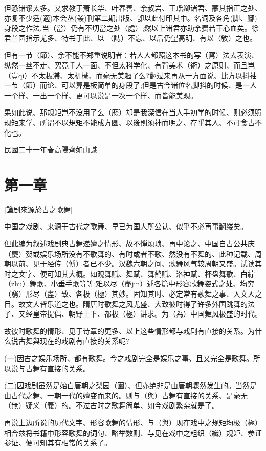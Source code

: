 \documentclass{zhvt-classic}
\begin{document}
但恐错谬太多。又求教于萧长华、叶春善、余叔岩、王瑶卿诸君、蒙其指正之处、亦复不少适(適)本会丛(叢)刊第二期出版、卽以此付印其中。名词及各角(脚、腳)身段之作法,当（當）仍有不切當之处（處）;然以上诸君亦助余费若干心血矣。徐君兰园指示尤多、特书于此、以𰵧（誌）不忘、以后仍望高明、有以（敎）之也。

但有一节（節）、余不能不郑重说明者：若人人都照这本书的写（寫）法去表演、纵然一丝不走、究竟千人一面、不但太科学化、有背美术（術）之原则、而且岂（豈qi）不太板滞、太机械、而毫无美趣了么?翻过来再从一方面说、比方以抖袖一节（節）而论、可以算是板简单的身段了;但是古今诸位名脚抖的时候、是一人一个样、一出一个样、更可以说是一次一个样、而皆能美观。

果如此说、那规矩岂不没用了么（厯）却是我深信在当人手初学的时候、则必须照规矩来学、所谓不以規矩不能成方圆、以後則须神而明之、存乎其人、不可食古不化也。

民國二十一年春高陽齊如山識

\chapter*[]{第一章}[論剧來源於古之歌舞]
\begin{preface}
中国之戏剧、来源于古代之歌舞、早已为国人所公认、似乎不必再事翻缕矣。
\end{preface}

但此编为叙述戏剧典古舞递嬗之情形、故不惮烦琐、再中论之、中国自古公共庆（慶）贺或娱乐场所没有不歌舞的、有时或者不歌、然没有不舞的、此种记载、周朝以前、见于经传（傅）者已不少。汉魏六朝之间、歌舞风气较周朝又盛。试读其时之文字、便可知其大概。如观舞赋、舞赋、舞鹤赋、洛神赋、杯盘舞歌、白紵（zhu）舞歌、小垂手歌等等;难以尽（盡jin）述各篇中形容歌舞姿式之处、均穷（窮）形尽（盡）致、各极（極）其妙。固知其时、必定常有歌舞之事、入文人之目。故文人皆乐道之也。隋唐时歌舞之风尤盛、大致彼时得了许多外国跳舞的法子、又经皇帝提倡、朝野上下、都极（極）讲求。为（為）中国舞风极盛的时代。

故彼时歌舞的情形、见于诗章的更多、以上这些情形都与戏剧有直接的关系。为什么说古舞與现在的戏剧有直接的关系呢?

(一)因古之娱乐场所、都有歌舞。今之戏剧完全是娱乐之事、且又完全是歌舞。所以说与古舞有直接的关系。

(二)因戏剧虽然是始白唐朝之梨园（園）、但亦绝非是由唐朝骤然发生的。当然是由古代之舞、一朝一代的嬗变而来的。则与（與）古舞有直接的关系、是毫无（無）疑义（義）的。不过古时之歌舞简单、如今戏剧繁杂就是了。

再说上边所说的历代文字、形容歌舞的情形、与（與）现在戏中之规矩均极（極）相合兹将书籍中形容歌舞的词句、略举数则、与见在戏中之粗织（織）规矩、参证参证、便可知其有相常的关系了。
\end{document}
